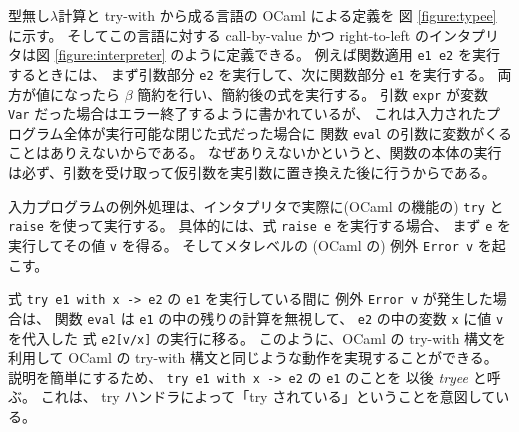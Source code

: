 型無し$\lambda$計算と try-with から成る言語の OCaml による定義を
図 \ref{figure:typee} に示す。
そしてこの言語に対する call-by-value かつ right-to-left のインタプリタは図 \ref{figure:interpreter} のように定義できる。
例えば関数適用 \texttt{e1 e2} を実行するときには、
まず引数部分 \texttt{e2} を実行して、次に関数部分 \texttt{e1} を実行する。
両方が値になったら $\beta$ 簡約を行い、簡約後の式を実行する。
引数 \texttt{expr} が変数 \texttt{Var} だった場合はエラー終了するように書かれているが、
これは入力されたプログラム全体が実行可能な閉じた式だった場合に
関数 \texttt{eval} の引数に変数がくることはありえないからである。
なぜありえないかというと、関数の本体の実行は必ず、引数を受け取って仮引数を実引数に置き換えた後に行うからである。

入力プログラムの例外処理は、インタプリタで実際に(OCaml の機能の) \texttt{try} と \texttt{raise} を使って実行する。
具体的には、式 \texttt{raise e} を実行する場合、
まず \texttt{e} を実行してその値 \texttt{v} を得る。
そしてメタレベルの (OCaml の) 例外 \texttt{Error v} を起こす。

式 \texttt{try e1 with x -> e2} の \texttt{e1} を実行している間に
例外 \texttt{Error v} が発生した場合は、
関数 \texttt{eval} は \texttt{e1} の中の残りの計算を無視して、
\texttt{e2} の中の変数 \texttt{x} に値 \texttt{v} を代入した
式 \texttt{e2[v/x]} の実行に移る。
このように、OCaml の try-with 構文を利用して OCaml の try-with 構文と同じような動作を実現することができる。
説明を簡単にするため、 \texttt{try e1 with x -> e2} の \texttt{e1} のことを
以後 \emph{tryee} と呼ぶ。
これは、 try ハンドラによって「try されている」ということを意図している。


